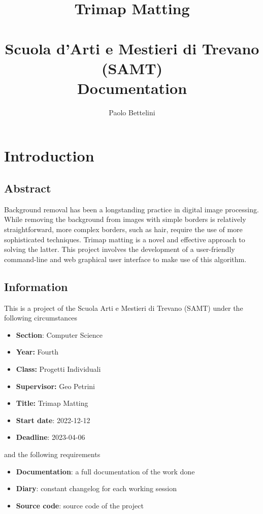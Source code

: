\documentclass[a4paper]{article}
\title{%
    Trimap Matting \\
    \phantom{} \\
    \large Scuola d'Arti e Mestieri di Trevano (SAMT) \\
    \large Documentation
}
\author{Paolo Bettelini}
\date{}
\begin{document}
\maketitle

\pagebreak

\tableofcontents

\pagebreak

\section{Introduction}

\subsection{Abstract}

Background removal has been a longstanding practice in digital image processing.
While removing the background from images with simple borders is relatively straightforward,
more complex borders, such as hair, require the use of more sophisticated techniques.
Trimap matting is a novel and effective approach to solving the latter.
This project involves the development of a user-friendly command-line and web graphical user interface
to make use of this algorithm.

\subsection{Information}

This is a project of the Scuola Arti e Mestieri di Trevano (SAMT) under the following circumstances

\begin{itemize}
    \item \textbf{Section}: Computer Science
    \item \textbf{Year:} Fourth
    \item \textbf{Class:} Progetti Individuali
    \item \textbf{Supervisor:} Geo Petrini
    \item \textbf{Title:} Trimap Matting
    \item \textbf{Start date}: 2022-12-12
    \item \textbf{Deadline}: 2023-04-06
\end{itemize}

and the following requirements

\begin{itemize}
    \item \textbf{Documentation}: a full documentation of the work done
    \item \textbf{Diary}: constant changelog for each working session
    \item \textbf{Source code}: source code of the project
\end{itemize}
\end{document}
